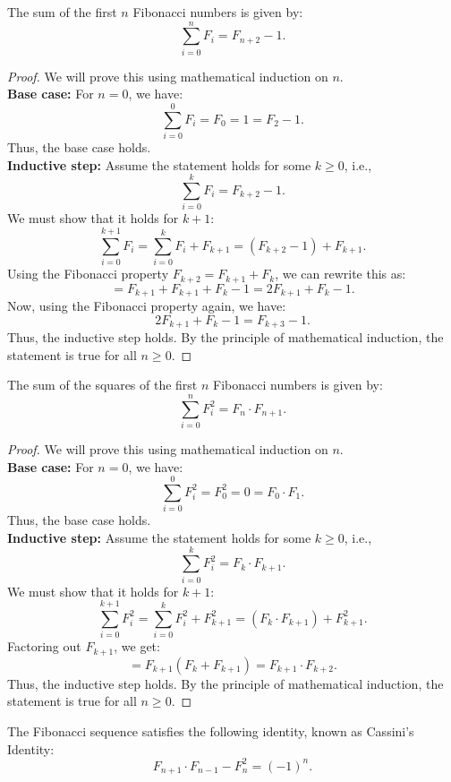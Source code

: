 \documentclass[openany]{book}
\begin{document}
\begin{mytheorem}
    The sum of the first $n$ Fibonacci numbers is given by:
    \[
        \sum_{i=0}^{n} F_i = F_{n+2} - 1.
    \]
\end{mytheorem}
\begin{proof}
    We will prove this using mathematical induction on $n$. \\
    \textbf{Base case:} For $n = 0$, we have:
    \[
        \sum_{i=0}^{0} F_i = F_0 = 1 = F_{2} - 1.
    \]
    Thus, the base case holds. \\ 
    \textbf{Inductive step:} Assume the statement holds for some $k \geq 0$, i.e.,
    \[
        \sum_{i=0}^{k} F_i = F_{k+2} - 1.
    \]
    We must show that it holds for $k + 1$:
    \[
        \sum_{i=0}^{k+1} F_i = \sum_{i=0}^{k} F_i + F_{k+1} = (F_{k+2} - 1) + F_{k+1}.
    \]
    Using the Fibonacci property $F_{k+2} = F_{k+1} + F_k$, we can rewrite this as:
    \[
        = F_{k+1} + F_{k+1} + F_k - 1 = 2F_{k+1} + F_k - 1.
    \]
    Now, using the Fibonacci property again, we have:
    \[
        2F_{k+1} + F_k - 1 = F_{k+3} - 1.
    \]
    Thus, the inductive step holds.
    By the principle of mathematical induction, the statement is true for all $n \geq 0$.
\end{proof}
\begin{mytheorem}
    The sum of the squares of the first $n$ Fibonacci numbers is given by:
    \[
        \sum_{i=0}^{n} F_i^2 = F_n \cdot F_{n+1}.
    \]
\end{mytheorem}
\begin{proof}
    We will prove this using mathematical induction on $n$. \\
    \textbf{Base case:} For $n = 0$, we have:
    \[
        \sum_{i=0}^{0} F_i^2 = F_0^2 = 0 = F_0 \cdot F_1.
    \]
    Thus, the base case holds. \\ 
    \textbf{Inductive step:} Assume the statement holds for some $k \geq 0$, i.e.,
    \[
        \sum_{i=0}^{k} F_i^2 = F_k \cdot F_{k+1}.
    \]
    We must show that it holds for $k + 1$:
    \[
        \sum_{i=0}^{k+1} F_i^2 = \sum_{i=0}^{k} F_i^2 + F_{k+1}^2 = (F_k \cdot F_{k+1}) + F_{k+1}^2.
    \]
    Factoring out $F_{k+1}$, we get:
    \[
        = F_{k+1}(F_k + F_{k+1}) = F_{k+1} \cdot F_{k+2}.
    \]
    Thus, the inductive step holds.
    By the principle of mathematical induction, the statement is true for all $n \geq 0$.
\end{proof}
\begin{mytheorem}
    The Fibonacci sequence satisfies the following identity, known as Cassini's Identity:
    \[
        F_{n+1} \cdot F_{n-1} - F_n^2 = (-1)^n.
    \]
\end{mytheorem}
\end{document}
